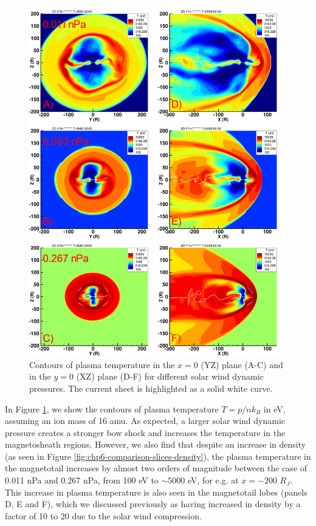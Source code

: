 \begin{figure}
    \centering
    \includegraphics[height=0.9\textheight]{images6/compare_runs_currentsheet_Temperature.png}
    \caption{Contours of plasma temperature in the $x=0$ (YZ) plane (A-C) and in the $y=0$ (XZ) plane (D-F) for different solar wind dynamic pressures. The current sheet is highlighted as a solid white curve.}
    \label{fig:chp6-comparison-slices-temperature}
\end{figure}

In Figure \ref{fig:chp6-comparison-slices-temperature}, we show the contours of plasma temperature $T = p/nk_B$ in eV, assuming an ion mass of 16 amu. As expected, a larger solar wind dynamic pressure creates a stronger bow shock and increases the temperature in the magnetosheath regions. However, we also find that despite an increase in density (as seen in Figure \ref{fig:chp6-comparison-slices-density}), the plasma temperature in the magnetotail increases by almost two orders of magnitude between the case of 0.011 nPa and 0.267 nPa, from 100 eV to $\sim$5000 eV, for e.g. at $x=-200$ $R_J$. This increase in plasma temperature is also seen in the magnetotail lobes (panels D, E and F), which we discussed previously as having increased in density by a factor of 10 to 20 due to the solar wind compression. 


